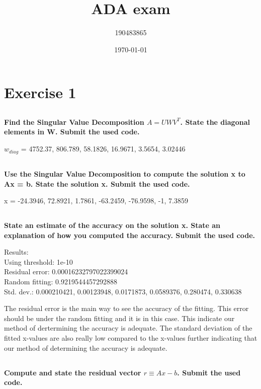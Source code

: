 \documentclass{article}
\title{ADA exam}
\author{190483865}
\date{\today}
\begin{document}
\maketitle
\tableofcontents
\newpage

\section{Exercise 1}

\subsection{}
\textbf{Find the Singular Value Decomposition $A = UWV^T$. State the diagonal elements in W. Submit the used code.}

$w_{diag}$ = 4752.37, 806.789, 58.1826, 16.9671, 3.5654, 3.02446

\subsection{}
\textbf{Use the Singular Value Decomposition to compute the solution x to Ax = b. State the solution x. Submit the used code.}

x = -24.3946, 72.8921, 1.7861, -63.2459, -76.9598, -1, 7.3859

\subsection{} 
\textbf{State an estimate of the accuracy on the solution x. State an explanation of how you computed the accuracy. Submit the used code.}

Results:\\
Using threshold: 1e-10\\
Residual error: 0.00016232797022399024\\
Random fitting: 0.9219544457292888\\
Std. dev.: 0.000210421, 0.00123948, 0.0171873, 0.0589376, 0.280474, 0.330638

The residual error is the main way to see the accuracy of the fitting. This error should be under the random fitting and it is in this case. This indicate our method of dertermining the accuracy is adequate.
The standard deviation of the fitted x-values are also really low compared to the x-values further indicating that our method of determining the accuracy is adequate.

\subsection{}
\textbf{Compute and state the residual vector $r \equiv Ax-b$. Submit the used code.}
\end{document}
